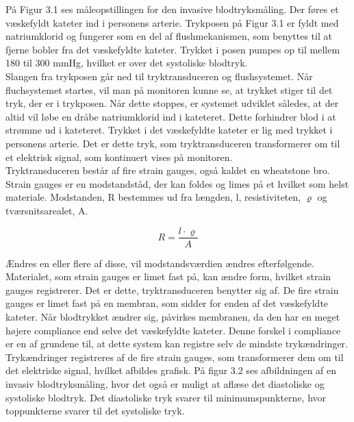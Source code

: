 På Figur 3.1 ses måleopstillingen for den invasive blodtryksmåling. Der føres et væskefyldt kateter ind i personens arterie. Trykposen på Figur 3.1 er fyldt med natriumklorid og fungerer som en del af flushmekanismen, som benyttes til at fjerne bobler fra det væskefyldte kateter. Trykket i posen pumpes op til mellem 180 til 300 mmHg, hvilket er over det systoliske blodtryk. \\
Slangen fra trykposen går ned til tryktransduceren og flushsystemet. Når fluchsystemet startes, vil man på monitoren kunne se, at trykket stiger til det tryk, der er i trykposen. Når dette stoppes, er systemet udviklet således, at der altid vil løbe en dråbe natriumklorid ind i kateteret. Dette forhindrer blod i at strømme ud i kateteret. Trykket i det væskefyldte kateter er lig med trykket i personens arterie. Det er dette tryk, som tryktransduceren transformerer om til et elektrisk signal, som kontinuert vises på monitoren. \\
Tryktransduceren består af fire strain gauges, også kaldet en wheatstone bro. Strain gauges er en modstandståd, der kan foldes og limes på et hvilket som helst materiale. Modstanden, R bestemmes ud fra længden, l, resistiviteten, $\varrho$ og tværsnitsarealet, A. 

\begin{equation}
	R = \frac{l \cdot \varrho}{A}
\end{equation}

Ændres en eller flere af disse, vil modstandsværdien ændres efterfølgende. Materialet, som strain gauges er limet fast på, kan ændre form, hvilket strain gauges registrerer. Det er dette, tryktransduceren benytter sig af. De fire strain gauges er limet fast på en membran, som sidder for enden af det væskefyldte kateter. Når blodtrykket ændrer sig, påvirkes membranen, da den har en meget højere compliance end selve det væskefyldte kateter. Denne forskel i compliance er en af grundene til, at dette system kan registre selv de mindste trykændringer. \\ 
Trykændringer registreres af de fire strain gauges, som transformerer dem om til det elektriske signal, hvilket afbildes grafisk. På figur 3.2 ses afbildningen af en invasiv blodtryksmåling, hvor det også er muligt at aflæse det diastoliske og systoliske blodtryk.  Det diastoliske tryk svarer til minimumspunkterne, hvor toppunkterne svarer til det systoliske tryk.


